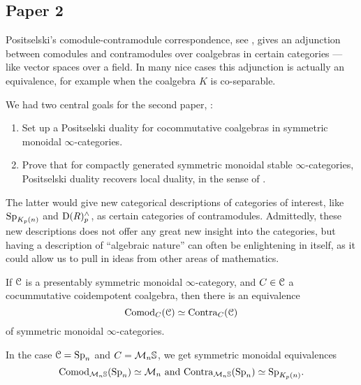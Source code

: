 

\subsection{Paper 2}

Positselski's comodule-contramodule correspondence, see \citeme,  gives an adjunction between comodules and contramodules over coalgebras in certain categories --- like vector spaces over a field. In many nice cases this adjunction is actually an equivalence, for example when the coalgebra $K$ is co-separable. 

We had two central goals for the second paper, \cite{aambo_2024_positselski}: 
\begin{enumerate}
    \item Set up a Positselski duality for cocommutative coalgebras in symmetric monoidal $\infty$-categories. 
    \item Prove that for compactly generated symmetric monoidal stable $\infty$-categories, Positselski duality recovers local duality, in the sense of \citeme. 
\end{enumerate}

The latter would give new categorical descriptions of categories of interest, like $\mathrm{Sp}_{K_p(n)}$ and $\mathrm{D}(R)^\wedge_p$, as certain categories of contramodules. Admittedly, these new descriptions does not offer any great new insight into the categories, but having a description of ``algebraic nature'' can often be enlightening in itself, as it could allow us to pull in ideas from other areas of mathematics. 

\begin{theorem}
    If $\EuScript{C}$ is a presentably symmetric monoidal $\infty$-category, and $C\in \EuScript{C}$ a cocummutative coidempotent coalgebra, then there is an equivalence 
    \[\mathrm{Comod}_C(\EuScript{C})\simeq \mathrm{Contra}_C(\EuScript{C})\]
    of symmetric monoidal $\infty$-categories. 
\end{theorem}

\begin{example}
    In the case $\EuScript{C}= \mathrm{Sp}_{n}$ and $C = \mathcal{M}_{n}\mathbb{S}$, we get symmetric monoidal equivalences 
    \[\mathrm{Comod}_{\mathcal{M}_{n}\mathbb{S}}(\mathrm{Sp}_{n}) \simeq \mathcal{M}_{n} \text{ and } \mathrm{Contra}_{\mathcal{M}_{n}\mathbb{S}}(\mathrm{Sp}_{n})\simeq \mathrm{Sp}_{K_p(n)}.\]
\end{example}


